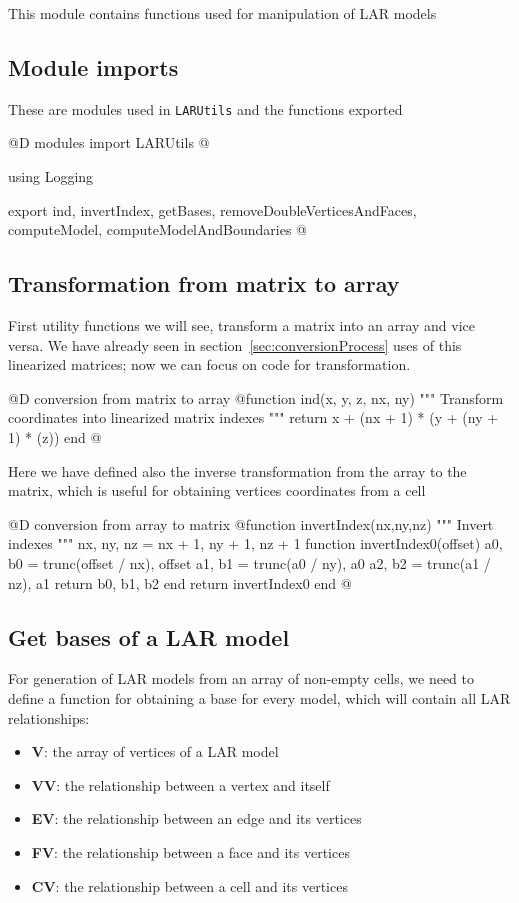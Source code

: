 \documentclass[11pt,oneside]{article}	%
\begin{document}
This module contains functions used for manipulation of LAR models

\subsection{Module imports}\label{sec:LARUtilsImports}

These are modules used in \texttt{LARUtils} and the functions exported

@D modules import LARUtils
@{using Logging

export ind, invertIndex, getBases, removeDoubleVerticesAndFaces,
    computeModel, computeModelAndBoundaries
@}

\subsection{Transformation from matrix to array}\label{sec:matrixTransform}

First utility functions we will see, transform a matrix into an array and vice versa. We have already seen in section~\ref{sec:conversionProcess} uses of this linearized matrices; now we can focus on code for transformation.

@D conversion from matrix to array
@{function ind(x, y, z, nx, ny)
    """
    Transform coordinates into linearized matrix indexes
    """
    return x + (nx + 1) * (y + (ny + 1) * (z))
end @}

Here we have defined also the inverse transformation from the array to the matrix, which is useful for obtaining vertices coordinates from a cell

@D conversion from array to matrix
@{function invertIndex(nx,ny,nz)
  """
  Invert indexes
  """
  nx, ny, nz = nx + 1, ny + 1, nz + 1
  function invertIndex0(offset)
      a0, b0 = trunc(offset / nx), offset %
      a1, b1 = trunc(a0 / ny), a0 %
      a2, b2 = trunc(a1 / nz), a1 %
      return b0, b1, b2
  end
  return invertIndex0
end @}

\subsection{Get bases of a LAR model}\label{sec:getBases}

For generation of LAR models from an array of non-empty cells, we need to define a function for obtaining a base for every model, which will contain all LAR relationships:
\begin{itemize}
 \item \textbf{V}: the array of vertices of a LAR model
 \item \textbf{VV}: the relationship between a vertex and itself
 \item \textbf{EV}: the relationship between an edge and its vertices
 \item \textbf{FV}: the relationship between a face and its vertices
 \item \textbf{CV}: the relationship between a cell and its vertices
\end{itemize}
\end{document}
